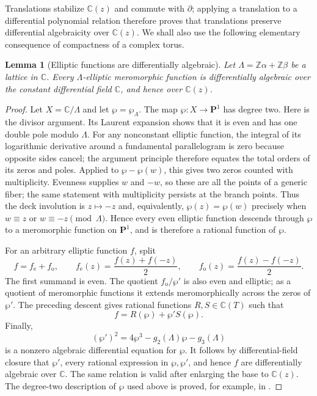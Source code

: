 \documentclass[11pt]{article}
\numberwithin{equation}{section}
\newtheorem{lemma}[theorem]{Lemma}
\theoremstyle{definition}
\theoremstyle{remark}
\newcommand{\C}{\mathbb C}
\newcommand{\Z}{\mathbb Z}
\begin{document}
Translations stabilize $\C(z)$ and commute with $\partial$; applying a
translation to a differential polynomial relation therefore proves that
translations preserve differential algebraicity over $\C(z)$.  We shall
also use the following elementary consequence of compactness of a complex
torus.

\begin{lemma}[Elliptic functions are differentially algebraic]
\label{lem:elliptic-DA}
Let $\Lambda=\Z\alpha+\Z\beta$ be a lattice in $\C$.  Every
$\Lambda$-elliptic meromorphic function is differentially algebraic over
the constant differential field $\C$, and hence over $\C(z)$.
\end{lemma}

\begin{proof}
Let $X=\C/\Lambda$ and let $\wp=\wp_\Lambda$.  The map
$\wp:X\to\mathbf P^1$ has degree two.  Here is the divisor argument.  Its
Laurent expansion shows that it is even and has one double pole modulo
$\Lambda$.  For any nonconstant elliptic function, the integral of its
logarithmic derivative around a fundamental parallelogram is zero because
opposite sides cancel; the argument principle therefore equates the total
orders of its zeros and poles.  Applied to $\wp-\wp(w)$, this gives two zeros
counted with multiplicity.  Evenness supplies $w$ and $-w$, so these are all
the points of a generic fiber; the same statement with multiplicity persists
at the branch points.  Thus the deck involution is $z\mapsto-z$ and,
equivalently, $\wp(z)=\wp(w)$ precisely when
$w\equiv z$ or $w\equiv-z\pmod\Lambda$.  Hence every even elliptic function
descends through $\wp$ to a meromorphic function on $\mathbf P^1$, and is
therefore a rational function of $\wp$.

For an arbitrary elliptic function $f$, split
\[
 f=f_{\mathrm e}+f_{\mathrm o},\qquad
 f_{\mathrm e}(z)=\frac{f(z)+f(-z)}2,\qquad
 f_{\mathrm o}(z)=\frac{f(z)-f(-z)}2.
\]
The first summand is even.  The quotient $f_{\mathrm o}/\wp'$ is also even
and elliptic; as a quotient of meromorphic functions it extends
meromorphically across the zeros of $\wp'$.  The preceding descent gives
rational functions $R,S\in\C(T)$ such that
\[
 f=R(\wp)+\wp'S(\wp).
\]
Finally,
\[
 (\wp')^2=4\wp^3-g_2(\Lambda)\wp-g_3(\Lambda)
\]
is a nonzero algebraic differential equation for $\wp$.  It follows by
differential-field closure that $\wp'$, every rational expression in
$\wp,\wp'$, and hence $f$ are differentially algebraic over $\C$.  The same
relation is valid after enlarging the base to $\C(z)$.  The degree-two
description of $\wp$ used above is proved, for example, in
\cite[Chapter~VI]{Lang1987}.
\end{proof}
\end{document}
